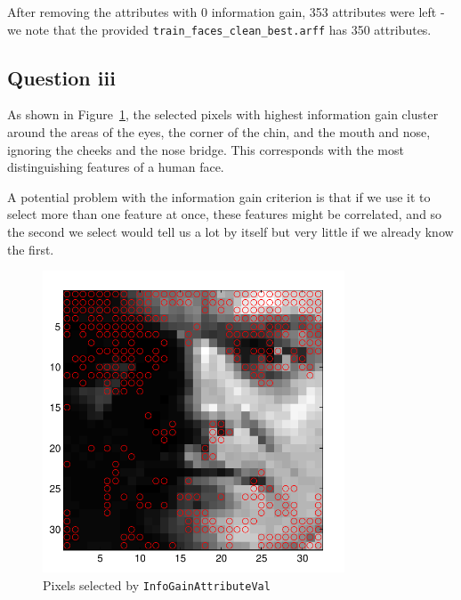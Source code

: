 \documentclass[a4paper]{article}
\begin{document}
After removing the attributes with 0 information gain, 353 attributes were left - we note that the provided {\tt train\_faces\_clean\_best.arff} has 350 attributes.

\subsection*{Question iii}
As shown in Figure~\ref{fig:b3img1}, the selected pixels with highest information gain cluster around the areas of the eyes, the corner of the chin, and the mouth and nose, ignoring the cheeks and the nose bridge. This corresponds with the most distinguishing features of a human face.

A potential problem with the information gain criterion is that if we use it to select more than one feature at once, these features might be correlated, and so the second we select would tell us a lot by itself but very little if we already know the first.

\begin{figure}[!htbp]
\centering
\includegraphics[width=0.8\textwidth]{B3-img1-pixels-cropped.pdf}
\caption{Pixels selected by {\tt InfoGainAttributeVal}}
\label{fig:b3img1}
\end{figure}

\FloatBarrier
\end{document}
